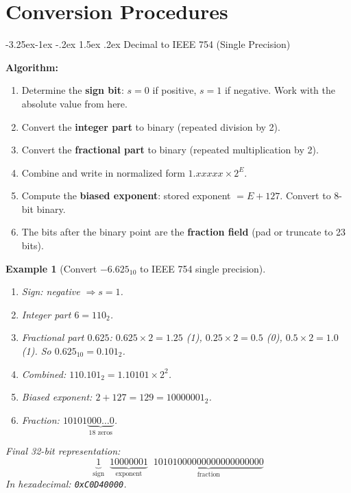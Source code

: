 \documentclass{article}
\makeatletter
\newtheorem{example}{Example}[section]
\theoremstyle{remark}
\newlength{\subsecindent}
\renewcommand\subsection{\@startsection{subsection}{2}{\subsecindent}%
  {-3.25ex\@plus -1ex \@minus -.2ex}%
  {1.5ex \@plus .2ex}%
  {\normalfont\large\bfseries}}
\newenvironment{sub}{%
  \begin{list}{}{%
    \setlength{\leftmargin}{4em}%
    \setlength{\rightmargin}{0pt}%
    \setlength{\topsep}{0pt}%
    \setlength{\partopsep}{0pt}%
    \setlength{\parsep}{\parskip}%
    \setlength{\itemsep}{\parskip}%
  }\item\relax
}{\end{list}}
\makeatother
\begin{document}
\section{Conversion Procedures}

\subsection{Decimal to IEEE 754 (Single Precision)}
\begin{sub}
\textbf{Algorithm:}
\begin{enumerate}
  \item Determine the \textbf{sign bit}: $s=0$ if positive, $s=1$ if negative.
        Work with the absolute value from here.
  \item Convert the \textbf{integer part} to binary (repeated division by 2).
  \item \colorbox{yellow!40}{Convert the \textbf{fractional part} to binary (repeated multiplication
        by 2).}
  \item Combine and write in normalized form $1.xxxxx \times 2^{E}$.
  \item Compute the \textbf{biased exponent}: stored exponent $= E + 127$.
        Convert to 8-bit binary.
  \item The bits after the binary point are the \textbf{fraction field} (pad or
        truncate to 23 bits).
\end{enumerate}

\begin{example}[Convert $-6.625_{10}$ to IEEE 754 single precision]
\leavevmode
\begin{enumerate}
  \item Sign: negative $\Rightarrow s = 1$.
  \item Integer part $6 = 110_2$.
  \item \colorbox{yellow!40}{Fractional part $0.625$:}
        \colorbox{yellow!40}{$0.625\times2=1.25$ (1),}
        \colorbox{yellow!40}{$0.25\times2=0.5$ (0),}
        \colorbox{yellow!40}{$0.5\times2=1.0$ (1).}
        \colorbox{yellow!40}{So $0.625_{10} = 0.101_2$.}
  \item Combined: $110.101_2 = 1.10101 \times 2^{2}$.
  \item Biased exponent: $2 + 127 = 129 = 10000001_2$.
  \item Fraction: $10101\underbrace{000\ldots0}_{18\text{ zeros}}$.
\end{enumerate}

Final 32-bit representation:
\[
  \underbrace{1}_{\text{sign}}\;\;
  \underbrace{10000001}_{\text{exponent}}\;\;
  \underbrace{10101000000000000000000}_{\text{fraction}}
\]
In hexadecimal: \texttt{0xC0D40000}.
\end{example}
\end{sub}
\end{document}
